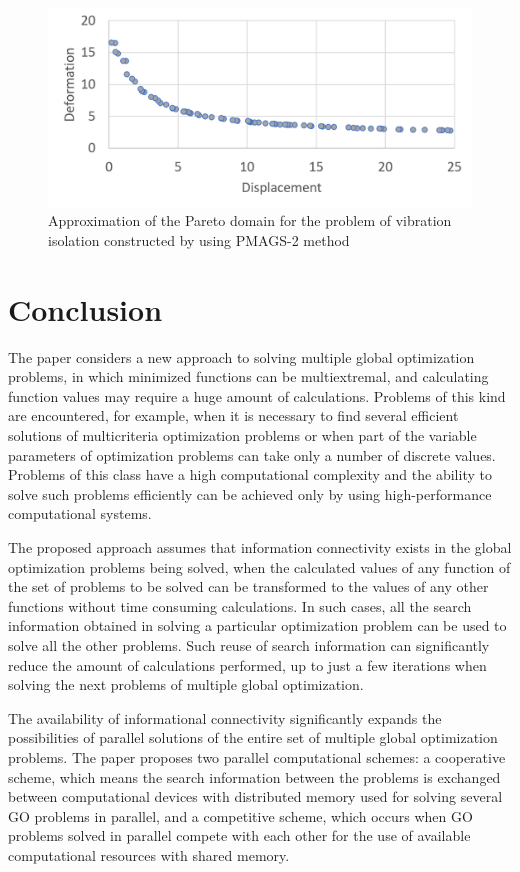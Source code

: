 \documentclass[review]{elsarticle}
\begin{document}
\begin{figure}
  \centering
  \includegraphics[width=0.7\linewidth]{fig6}
  \caption{Approximation of the Pareto domain for the problem of vibration isolation constructed by using PMAGS-2 method}
  \label{fig:6}
\end{figure}


\section{Conclusion}\label{sec:6}

The paper considers a new approach to solving multiple global optimization problems, in which minimized functions can be multiextremal, and calculating function values may require a huge amount of calculations. Problems of this kind are encountered, for example, when it is necessary to find several efficient solutions of multicriteria optimization problems or when part of the variable parameters of optimization problems can take only a number of discrete values. Problems of this class have a high computational complexity and the ability to solve such problems efficiently can be achieved only by using high-performance computational systems.

The proposed approach assumes that information connectivity exists in the global optimization problems being solved, when the calculated values of any function of the set of problems to be solved can be transformed to the values of any other functions without time consuming calculations. In such cases, all the search information obtained in solving a particular optimization problem can be used to solve all the other problems. Such reuse of search information can significantly reduce the amount of calculations performed, up to just a few iterations when solving the next problems of multiple global optimization.

The availability of informational connectivity significantly expands the possibilities of parallel solutions of the entire set of multiple global optimization problems. The paper proposes two parallel computational schemes: a cooperative scheme, which means the search information between the problems is exchanged between computational devices with distributed memory used for solving several GO problems in parallel, and a competitive scheme, which occurs when GO problems solved in parallel compete with each other for the use of available computational resources with shared memory.
\end{document}
